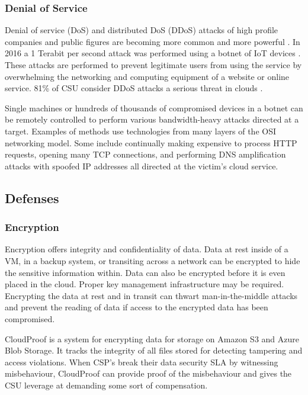 \documentclass[12pt]{article}
\begin{document}
\subsubsection{Denial of Service}

Denial of service (DoS) and distributed DoS (DDoS) attacks of high profile companies and public figures are becoming more common and more powerful \cite{verisignddos}. In 2016 a 1 Terabit per second attack was performed using a botnet of IoT devices \cite{arsddos}. These attacks are performed to prevent legitimate users from using the service by overwhelming the networking and computing equipment of a website or online service. 81\% of CSU consider DDoS attacks a serious threat in clouds \cite{top2013notorious}.

Single machines or hundreds of thousands of compromised devices in a botnet can be remotely controlled to perform various bandwidth-heavy attacks directed at a target. Examples of methods use technologies from many layers of the OSI networking model. Some include continually making expensive to process HTTP requests, opening many TCP connections, and performing DNS amplification attacks with spoofed IP addresses all directed at the victim's cloud service.






\subsection{Defenses}

\subsubsection{Encryption}

Encryption offers integrity and confidentiality of data. Data at rest inside of a VM, in a backup system, or transiting across a network can be encrypted to hide the sensitive information within. Data can also be encrypted before it is even placed in the cloud. Proper key management infrastructure may be required. Encrypting the data at rest and in transit can thwart man-in-the-middle attacks and prevent the reading of data if access to the encrypted data has been compromised.

CloudProof \cite{popa2011enabling} is a system for encrypting data for storage on Amazon S3 and Azure Blob Storage. It tracks the integrity of all files stored for detecting tampering and access violations. When CSP's break their data security SLA by witnessing misbehaviour, CloudProof can provide proof of the misbehaviour and gives the CSU leverage at demanding some sort of compensation.
\end{document}
